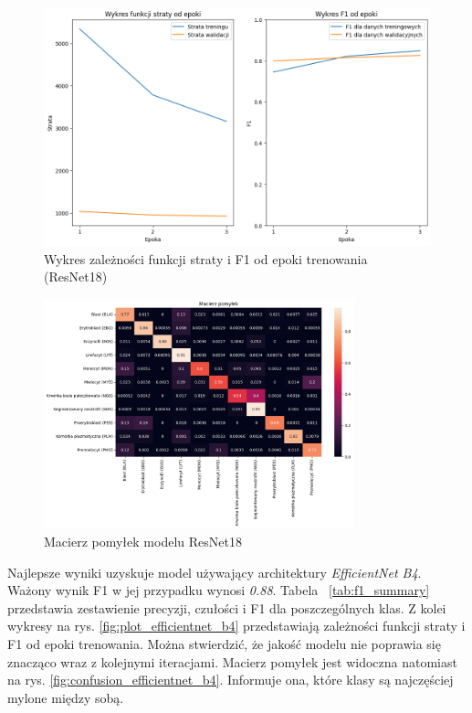 \begin{figure}
    \centering
    \includegraphics[width=\textwidth]{experiments/resnet18/combined}
    \caption{Wykres zależności funkcji straty i F1 od epoki trenowania (ResNet18)}
    \label{fig:plot_resnet18}
\end{figure}
\begin{figure}
    \centering
    \includegraphics[width=0.8\textwidth]{experiments/resnet18/confusion_matrix}
    \caption{Macierz pomyłek modelu ResNet18}
    \label{fig:confusion_resnet18}
\end{figure}


Najlepsze wyniki uzyskuje model używający architektury \textit{EfficientNet B4}.
Ważony wynik F1 w jej przypadku wynosi \textit{0.88}.
Tabela ~\ref{tab:f1_summary} przedstawia zestawienie precyzji, czułości i F1 dla poszczególnych klas.
Z kolei wykresy na rys. \ref{fig:plot_efficientnet_b4} przedstawiają zależności funkcji straty i F1 od epoki trenowania.
Można stwierdzić, że jakość modelu nie poprawia się znacząco wraz z kolejnymi iteracjami.
Macierz pomyłek jest widoczna natomiast na rys. \ref{fig:confusion_efficientnet_b4}.
Informuje ona, które klasy są najczęściej mylone między sobą.


